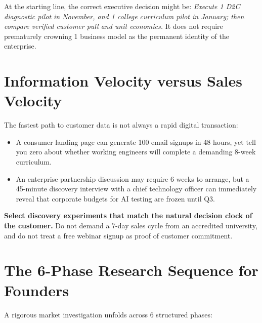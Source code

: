 At the starting line, the correct executive decision might be: \textit{Execute 1 D2C diagnostic pilot in November, and 1 college curriculum pilot in January; then compare verified customer pull and unit economics.} It does not require prematurely crowning 1 business model as the permanent identity of the enterprise.

\section{Information Velocity versus Sales Velocity}

The fastest path to customer data is not always a rapid digital transaction:
\begin{itemize}[leftmargin=12pt,itemsep=1pt,topsep=1pt]
  \item A consumer landing page can generate 100 email signups in 48 hours, yet tell you zero about whether working engineers will complete a demanding 8-week curriculum.
  \item An enterprise partnership discussion may require 6 weeks to arrange, but a 45-minute discovery interview with a chief technology officer can immediately reveal that corporate budgets for AI testing are frozen until Q3.
\end{itemize}

\textbf{Select discovery experiments that match the natural decision clock of the customer.} Do not demand a 7-day sales cycle from an accredited university, and do not treat a free webinar signup as proof of customer commitment.

\section{The 6-Phase Research Sequence for Founders}

A rigorous market investigation unfolds across 6 structured phases:


